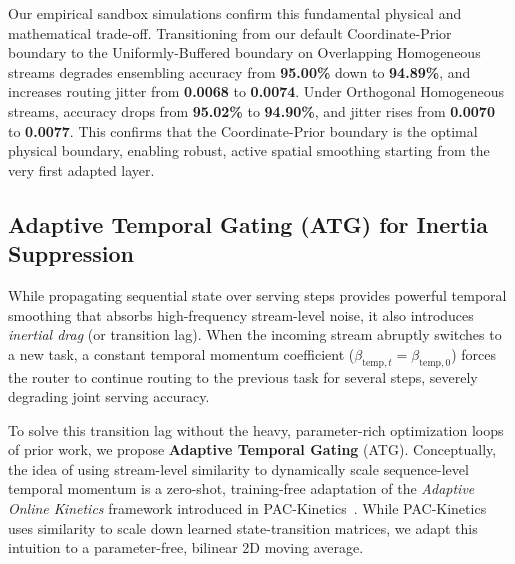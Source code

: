 Our empirical sandbox simulations confirm this fundamental physical and mathematical trade-off. Transitioning from our default Coordinate-Prior boundary to the Uniformly-Buffered boundary on Overlapping Homogeneous streams degrades ensembling accuracy from \textbf{95.00\%} down to \textbf{94.89\%}, and increases routing jitter from \textbf{0.0068} to \textbf{0.0074}. Under Orthogonal Homogeneous streams, accuracy drops from \textbf{95.02\%} to \textbf{94.90\%}, and jitter rises from \textbf{0.0070} to \textbf{0.0077}. This confirms that the Coordinate-Prior boundary is the optimal physical boundary, enabling robust, active spatial smoothing starting from the very first adapted layer.

\subsection{Adaptive Temporal Gating (ATG) for Inertia Suppression}
While propagating sequential state over serving steps provides powerful temporal smoothing that absorbs high-frequency stream-level noise, it also introduces \emph{inertial drag} (or transition lag). When the incoming stream abruptly switches to a new task, a constant temporal momentum coefficient ($\beta_{\text{temp}, t} = \beta_{\text{temp}, 0}$) forces the router to continue routing to the previous task for several steps, severely degrading joint serving accuracy.

To solve this transition lag without the heavy, parameter-rich optimization loops of prior work, we propose \textbf{Adaptive Temporal Gating} (ATG). Conceptually, the idea of using stream-level similarity to dynamically scale sequence-level temporal momentum is a zero-shot, training-free adaptation of the \emph{Adaptive Online Kinetics} framework introduced in PAC-Kinetics~\cite{pac_kinetics}. While PAC-Kinetics uses similarity to scale down learned state-transition matrices, we adapt this intuition to a parameter-free, bilinear 2D moving average. 

